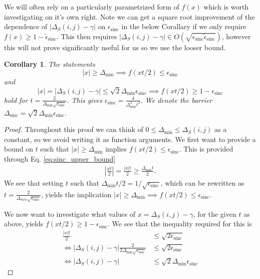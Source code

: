 \documentclass{article}
\newtheorem{corollary}[theorem]{Corollary}
\newcommand{\parens}[1]{\left( #1 \right)}
\newcommand{\abs}[1]{\left| #1 \right|}
\newcommand{\bigo}[1]{O\left( #1 \right)}
\DeclareMathOperator{\sinc}{sinc}
\begin{document}
We will often rely on a particularly parametrized form of $f(x)$ which is worth investigating on it's own right. Note we can get a square root improvement of the dependence of $|\Delta_S(i,j) - \gamma|$ on $\epsilon_{\sinc}$ in the below Corallary if we only require $f(x) \geq 1 - \widetilde{\epsilon}_{\sinc}$. This then requires $|\Delta_S(i,j) - \gamma| \in \bigo{\sqrt{\epsilon_{\sinc} \widetilde{\epsilon}_{\sinc}}}$, however this will not prove significantly useful for us so we use the looser bound.
\begin{corollary} \label{cor:gamma_difference_reqs}
    The statements 
    $$|x| \geq \Delta_{\min} \implies f\parens{xt / 2} \leq \epsilon_{\sinc}$$
    and
    $$|x| = |\Delta_S(i,j) - \gamma| \leq \sqrt{2} \Delta_{\min} \epsilon_{\sinc} \implies f(xt/2) \geq 1 - \epsilon_{\sinc}$$
    hold for $t = \frac{2}{\Delta_{\min} \sqrt{\epsilon_{\sinc}}}$. This gives $\epsilon_{\sinc} = \frac{4}{\Delta_{\min}^2 t^2}$. We denote the barrier $\Delta_{\sinc} = \sqrt{2} \Delta_{\min} \epsilon_{\sinc}$. 
\end{corollary}
\begin{proof}
    Throughout this proof we can think of $0 \leq \Delta_{\min} \leq \Delta_S(i,j)$ as a constant, so we avoid writing it as function arguments.
    We first want to provide a bound on $t$ such that $|x| \geq \Delta_{\min}$ implies $f(xt/2) \leq \epsilon_{\sinc}$. This is provided through Eq. \eqref{eq:sinc_upper_bound}
    \begin{align}
        \left| \frac{x t }{ 2} \right| = \frac{|x| t}{2} \geq \frac{\Delta_{\min}t}{2}.
    \end{align}
    We see that setting $t$ such that $\Delta_{\min} t / 2 = 1 /\sqrt{\epsilon_{\sinc}}$, which can be rewritten as $t = \frac{2}{\Delta_{min} \sqrt{\epsilon_{\sinc}}}$, yields the implication $|x| \geq \Delta_{\min} \implies f(xt/2) \leq \epsilon_{\sinc}$. 

    We now want to investigate what values of $x = \Delta_S(i,j) - \gamma$, for the given $t$ as above, yields $f(xt/2) \geq 1 - \epsilon_{\sinc}$. We see that the inequality required for this is
    \begin{align}
        \frac{|x| t}{2} &\leq \sqrt{2 \epsilon_{\sinc}} \\
        \iff  |\Delta_S(i,j) - \gamma| \frac{2}{2 \Delta_{\min} \sqrt{\epsilon_{\sinc}}} &\leq \sqrt{2 \epsilon_{\sinc}} \\
        \iff \abs{\Delta_S(i,j) - \gamma} &\leq \sqrt{2} \Delta_{\min} \epsilon_{\sinc}
    \end{align}
\end{proof}
\end{document}
